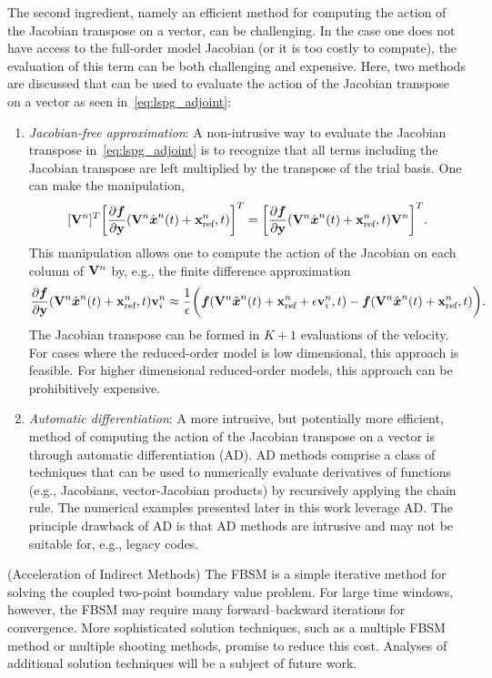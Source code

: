 The second ingredient, namely an efficient method for computing the action of the Jacobian transpose on a vector, can be challenging. 
In the case one does not have access to the full-order model Jacobian (or it is too costly to compute), the evaluation of this term can be both challenging and expensive. Here, two methods are discussed that can be used to evaluate the action of the Jacobian transpose on a vector as seen in~\eqref{eq:lspg_adjoint}:
\begin{enumerate}
\item \textit{Jacobian-free approximation}: A non-intrusive way to evaluate the Jacobian transpose in~\eqref{eq:lspg_adjoint} is to recognize that all terms including the Jacobian transpose are left multiplied by the transpose of the trial basis. One can make the manipulation,
$$[\mathbf {V}^{n}]^T \bigg[\frac{\partial \boldsymbol f}{\partial \mathbf{y}} (\mathbf {V}^{n} \hat{ \boldsymbol x}^{n}(t) + \mathbf{x}_\text{ref}^{n},t)\bigg]^T = \bigg[  \frac{\partial \boldsymbol f}{\partial \mathbf{y}} (\mathbf {V}^{n} \hat{ \boldsymbol x}^{n}(t) + \mathbf{x}_\text{ref}^{n},t) \mathbf {V}^{n} \bigg]^T.$$
This manipulation allows one to compute the action of the Jacobian on each column of $\mathbf {V}^{n}$ by, e.g., the finite difference approximation
$$\frac{\partial \boldsymbol f}{\partial \mathbf{y}}(\mathbf {V}^{n} \hat{ \boldsymbol x}^{n}(t) + \mathbf{x}_\text{ref}^{n},t) \mathbf{v}_i^n \approx \frac{1}{\epsilon}\bigg( \boldsymbol f(\mathbf {V}^{n}\hat{ \boldsymbol x}^{n}(t) + \mathbf{x}_\text{ref}^{n} + \epsilon \mathbf{v}_i^n,t) - \boldsymbol f(\mathbf {V}^{n} \hat{ \boldsymbol x}^{n}(t) + \mathbf{x}_\text{ref}^{n},t) \bigg).$$
The Jacobian transpose can be formed in $K+1$ evaluations of the velocity. For cases where the reduced-order model is low dimensional, this approach is feasible. For higher dimensional reduced-order models, this approach can be prohibitively expensive.

\item \textit{Automatic differentiation}: A more intrusive, but potentially more efficient, method of computing the action of the Jacobian transpose on a vector is through automatic differentiation (AD). AD methods comprise a class of techniques that can be used to numerically evaluate derivatives of functions (e.g., Jacobians, vector-Jacobian products) by recursively applying the chain rule. The numerical examples presented later in this work leverage AD. The principle drawback of AD is that AD methods are intrusive and may not be suitable for, e.g., legacy codes.  
\end{enumerate}

\begin{remark}\label{remark:fbsm}(Acceleration of Indirect Methods)
The FBSM is a simple iterative method for solving the coupled two-point boundary value problem. For large time windows, however, the FBSM may require many 
forward--backward iterations for convergence. More sophisticated solution techniques, such as a multiple FBSM method or multiple shooting methods, promise 
to reduce this cost. Analyses of additional solution techniques will be a subject of future work.
\end{remark}

